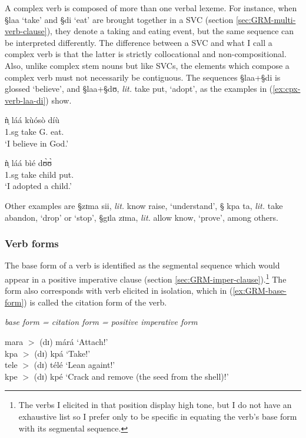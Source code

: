 A complex verb is  composed of more than one verbal lexeme. For
instance, when {\S laa} `take' and {\S di}
`eat' are brought together in a SVC (section \ref{sec:GRM-multi-verb-clause}),
they denote a taking and eating event, but
the same sequence can be interpreted  differently. The difference between a
SVC  and what I call a complex verb is that the latter is strictly
collocational and non-compositional. Also, unlike complex stem nouns but like
SVCs, the elements which compose a complex verb
must not necessarily be contiguous.  The sequences  {\S laa}+{\S di}
is glossed  `believe', and {\S laa}+{\S dʊ}, {\it lit.} take put,  `adopt', as
the examples in  (\ref{ex:cpx-verb-laa-di}) show.

\begin{exe}
\ex\label{ex:cpx-verb-laa-di}
\begin{xlist}
\ex
 \gll ǹ̩ láá kùósò díù \\
{\sc 1.sg} take G.  eat.{\foc}  \\
\glt `I believe in God.'

\ex
 \gll  ǹ̩ láá bìé dʊ̀ʊ̀ \\
{\sc 1.sg} take child put.{\foc}  \\
\glt `I adopted a child.'

\end{xlist}
\end{exe}

Other examples are {\S zɪma sii}, {\it lit.} know raise, `understand',  {\S
kpa ta}, {\it lit.}  take abandon, `drop' or `stop', {\S gɪla zɪma}, {\it lit.}
allow know, `prove', among others. 



\subsubsection{Verb forms}
\label{sec:GRM-verb-word}

The base form of a verb is identified as the segmental sequence which  would
appear in a positive imperative clause (section
\ref{sec:GRM-imper-clause}).\footnote{The verbs I elicited in that position
display high tone, but I do not have an exhaustive list so I prefer only to be
specific in equating the verb's base form with its segmental sequence.}
The form also corresponds  with verb elicited in isolation, which in
(\ref{ex:GRM-base-form}) is called the  citation form of the verb. 

\begin{exe}
\ex\label{ex:GRM-base-form}{\it base form = citation form = positive
imperative form}
\begin{xlist}
mara $>$ (dɪ) márá  `Attach!' \\
kpa  $>$  (dɪ)  kpá  `Take!'\\
tele  $>$  (dɪ)  télé  `Lean againt!'\\
kpe $>$   (dɪ)  kpé  `Crack and remove (the seed from the shell)!'

\end{xlist}
\end{exe}




